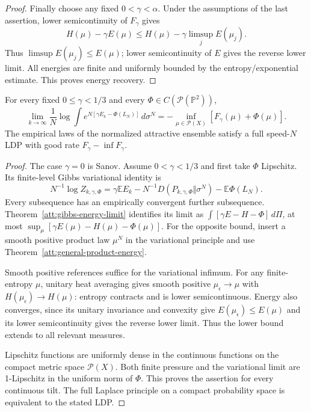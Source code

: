 \begin{proof}
Finally choose any fixed $0<\gamma<\alpha$. Under the assumptions
of the last assertion, lower semicontinuity of $F_\gamma$ gives
\[
 H(\mu)-\gamma E(\mu)
 \le H(\mu)-\gamma\limsup_j E(\mu_j).
\]
Thus $\limsup E(\mu_j)\le E(\mu)$; lower semicontinuity of $E$
gives the reverse lower limit. All energies are finite and uniformly
bounded by the entropy/exponential estimate. This proves energy recovery.
\end{proof}

\begin{theorem}
\label{att:full-laplace}
For every fixed $0\le\gamma<1/3$ and every
$\Phi\in C(\mathcal P(\mathbb P^2))$,
\begin{equation}
 \lim_{k\to\infty}\frac1N\log\int
       e^{N[\gamma E_k-\Phi(L_N)]}\,d\sigma^N
 =-\inf_{\mu\in\mathcal P(X)}[F_\gamma(\mu)+\Phi(\mu)].
 \label{att:full-laplace-eq}
\end{equation}
The empirical laws of the normalized attractive ensemble satisfy a
full speed-$N$ LDP with good rate
$F_\gamma-\inf F_\gamma$.
\end{theorem}

\begin{proof}
The case $\gamma=0$ is Sanov. Assume $0<\gamma<1/3$ and first take
$\Phi$ Lipschitz. Its finite-level Gibbs variational identity is
\[
 N^{-1}\log Z_{k,\gamma,\Phi}
 =\gamma\mathbb E E_k-N^{-1}D(P_{k,\gamma,\Phi}\Vert\sigma^N)
                         -\mathbb E\Phi(L_N).
\]
Every subsequence has an empirically convergent further subsequence.
Theorem~\ref{att:gibbs-energy-limit} identifies its limit as
$\int[\gamma E-H-\Phi]\,d\Pi$, at most
$\sup_\mu[\gamma E(\mu)-H(\mu)-\Phi(\mu)]$.
For the opposite bound, insert a smooth positive product law $\mu^N$
in the variational principle and use
Theorem~\ref{att:general-product-energy}.

Smooth positive references suffice for the variational infimum.
For any finite-entropy $\mu$, unitary heat averaging gives smooth
positive $\mu_\epsilon\to\mu$ with $H(\mu_\epsilon)\to H(\mu)$:
entropy contracts and is lower semicontinuous. Energy also converges,
since its unitary invariance and convexity give
$E(\mu_\epsilon)\le E(\mu)$ and its lower semicontinuity gives the
reverse lower limit. Thus the lower bound extends to all relevant
measures.

Lipschitz functions are uniformly dense in the continuous functions
on the compact metric space $\mathcal P(X)$. Both finite pressure and
the variational limit are 1-Lipschitz in the uniform norm of $\Phi$.
This proves the assertion for every continuous tilt. The full Laplace
principle on a compact probability space is equivalent to the stated
LDP.
\end{proof}

